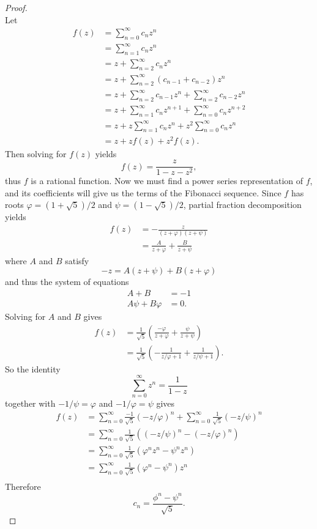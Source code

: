 \documentclass{article}
\begin{document}
\begin{proof} \text{} \\
  Let \begin{align*}
    f(z) &= \sum_{n=0}^\infty c_nz^n \\
    &= \sum_{n=1}^\infty c_nz^n \\
    &= z + \sum_{n=2}^\infty c_nz^n \\
    &= z + \sum_{n=2}^\infty (c_{n-1} + c_{n-2})z^n \\
    &= z + \sum_{n=2}^\infty c_{n-1}z^n + \sum_{n=2}^\infty c_{n-2}z^n \\
    &= z + \sum_{n=1}^\infty c_{n}z^{n+1} + \sum_{n=0}^\infty c_{n}z^{n+2} \\
    &= z + z\sum_{n=1}^\infty c_{n}z^n + z^2\sum_{n=0}^\infty c_{n}z^n \\
    &= z + zf(z) + z^2f(z).
  \end{align*}
  Then solving for $f(z)$ yields \[
    f(z) = \frac{z}{1 - z - z^2},
  \] thus $f$ is a rational function.
  Now we must find a power series representation of $f$, and its coefficients
  will give us the terms of the Fibonacci sequence. Since $f$ has roots
  $\varphi = (1 + \sqrt{5})/2$ and $\psi = (1 - \sqrt{5})/2$, partial fraction
  decomposition yields \begin{align*}
    f(z)
    &= -\frac{z}{(z + \varphi)(z + \psi)}  \\
    &= \frac{A}{z + \varphi} + \frac{B}{z + \psi}
  \end{align*} where $A$ and $B$ satisfy \[
    -z = A(z + \psi) + B(z + \varphi)
  \] and thus the system of equations \begin{align*}
    A + B &= -1 \\
    A\psi + B\varphi &= 0.
  \end{align*} Solving for $A$ and  $B$ gives \begin{align*}
    f(z) &= \frac{1}{\sqrt{5}}\left(\frac{-\varphi}{z + \varphi} + \frac{\psi}{z + \psi}\right) \\
    &= \frac{1}{\sqrt{5}}\left(-\frac{1}{z/\varphi + 1} + \frac{1}{z/\psi + 1}\right).
  \end{align*}
  So the identity \[
    \sum_{n=0}^\infty {z^n} = \frac{1}{1-z}
  \] together with $-1/\psi = \varphi$ and $-1/\varphi = \psi$ gives \begin{align*}
    f(z)
      &= \sum_{n=0}^\infty \frac{-1}{\sqrt{5}}(-z/\varphi)^n + \sum_{n=0}^\infty \frac{1}{\sqrt{5}}(-z/\psi)^n \\
      &= \sum_{n=0}^\infty \frac{1}{\sqrt{5}}\left((-z/\psi)^n - (-z/\varphi)^n \right) \\
      &= \sum_{n=0}^\infty \frac{1}{\sqrt{5}}\left(\varphi^n z^n - \psi^nz^n \right) \\
      &= \sum_{n=0}^\infty \frac{1}{\sqrt{5}}\left(\varphi^n - \psi^n \right)z^n \\
  \end{align*}
  Therefore \[
    c_n = \frac{\phi^n - \psi^n}{\sqrt{5}}.
  \]
\end{proof}
\pagebreak
\end{document}
